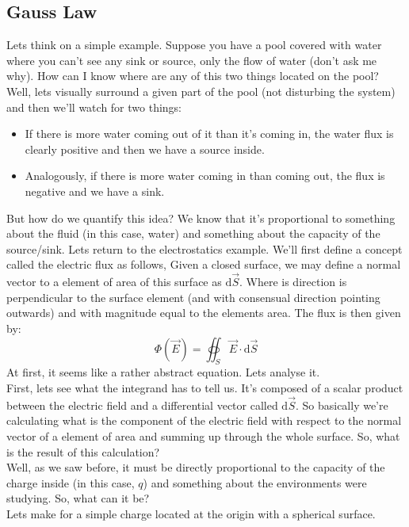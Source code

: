 	\subsection{Gauss Law}
		Lets think on a simple example. Suppose you have a pool covered with water where you can't see any sink or source, only the flow of water (don't ask me why). How can I know where are any of this two things located on the pool?\\
		Well, lets visually surround a given part of the pool (not disturbing the system) and then we'll watch for two things:\\
		\begin{itemize}
			\item If there is more water coming out of it than it's coming in, the water flux is clearly positive and then we have a source inside.
			\item Analogously, if there is more water coming in than coming out, the flux is negative and we have a sink.
		\end{itemize}
		But how do we quantify this idea? We know that it's proportional to something about the fluid (in this case, water) and something about the capacity of the source/sink. Lets return to the electrostatics example.
		We'll first define a concept called the electric flux as follows, Given a closed surface, we may define a normal vector to a element of area of this surface as $\text{d}\vec{S}$. Where is direction is perpendicular to the surface element (and with consensual direction pointing outwards) and with magnitude equal to the elements area. The flux is then given by:
		\begin{equation}
			\Phi(\vec{E}) = \oiint_S \vec{E} \cdot \text{d}\vec{S}
		\end{equation}
		At first, it seems like a rather abstract equation. Lets analyse it.\\
		First, lets see what the integrand has to tell us. It's composed of a scalar product between the electric field and a differential vector called $\text{d}\vec{S}$. So basically we're calculating what is the component of the electric field with respect to the normal vector of a element of area and summing up through the whole surface. So, what is the result of this calculation?\\
		Well, as we saw before, it must be directly proportional to the capacity of the charge inside (in this case, $q$) and something about the environments were studying. So, what can it be?\\
		Lets make for a simple charge located at the origin with a spherical surface.
